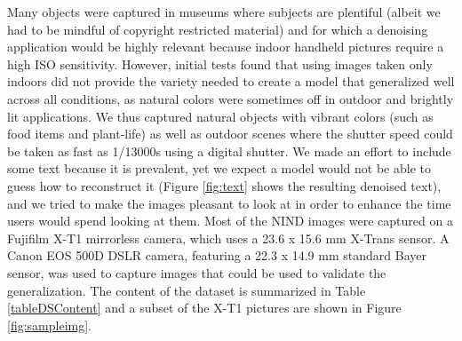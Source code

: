 \documentclass[10pt,twocolumn,letterpaper]{article}
\begin{document}
\begin{table}[]
\centering
{}\caption{Dataset content}
\vspace{-0.2cm} 
\label{tableDSContent}
\end{table}

Many objects were captured in museums where subjects are plentiful (albeit we had to be mindful of copyright restricted material) and for which a denoising application would be highly relevant because indoor handheld pictures require a high ISO sensitivity. However, initial tests found that using images taken only indoors did not provide the variety needed to create a model that generalized well across all conditions, as natural colors were sometimes off in outdoor and brightly lit applications. We thus captured natural objects with vibrant colors (such as food items and plant-life) as well as outdoor scenes where the shutter speed could be taken as fast as 1/13000s using a digital shutter. We made an effort to include some text because it is prevalent, yet we expect a model would not be able to guess how to reconstruct it (Figure \ref{fig:text} shows the resulting denoised text), and we tried to make the images pleasant to look at in order to enhance the time users would spend looking at them. Most of the NIND images were captured on a Fujifilm X-T1 mirrorless camera, which uses a 23.6 x 15.6 mm X-Trans sensor. A Canon EOS 500D DSLR camera, featuring a 22.3 x 14.9 mm standard Bayer sensor, was used to capture images that could be used to validate the generalization. The content of the dataset is summarized in Table \ref{tableDSContent} and a subset of the X-T1 pictures are shown in Figure \ref{fig:sampleimg}.
\end{document}
